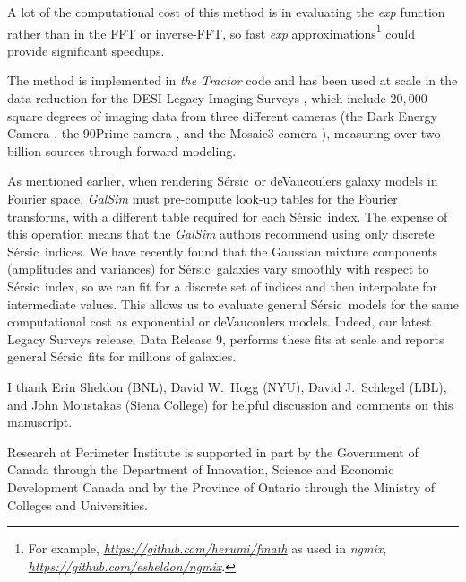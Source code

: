\documentclass[11pt,letterpaper]{aastex63}
\newcommand{\niceurl}[1]{\href{#1}{\textsl{#1}}}
\newcommand{\project}[1]{\textsl{#1}}
\newcommand{\sersic}{S\'ersic}
\begin{document}
A lot of the computational cost of this method is in
evaluating the \emph{exp} function rather than in the FFT or
inverse-FFT, so fast \emph{exp} approximations\footnote{For example,
  \niceurl{https://github.com/herumi/fmath} as used in
  \project{ngmix}, \niceurl{https://github.com/esheldon/ngmix}.}
could provide significant speedups.
%




The method is implemented in \project{the Tractor} code and has been
used at scale in the data reduction for the DESI Legacy Imaging Surveys
\citep{dey}, which include $20,000$ square degrees of imaging data from
three different cameras (the Dark Energy Camera \citep{decam},
the 90Prime camera \citep{90prime}, and the Mosaic3 camera \citep{mosaic3}),
measuring over two billion sources through forward modeling.


As mentioned earlier, when rendering \sersic\ or deVaucoulers galaxy
models in Fourier space, \project{GalSim} must pre-compute look-up
tables for the Fourier transforms, with a different table required for
each \sersic\ index.  The expense of this operation means that the
\project{GalSim} authors recommend using only discrete
\sersic\ indices.  We have recently found that the Gaussian mixture
components (amplitudes and variances) for \sersic\ galaxies vary
smoothly with respect to \sersic\ index, so we can fit for a discrete
set of indices and then interpolate for intermediate values.
This allows us to evaluate general \sersic\ models for the same
computational cost as exponential or deVaucoulers models.
Indeed, our latest Legacy Surveys release, Data Release 9, performs
these fits at scale and reports general \sersic\ fits for millions of
galaxies.




\acknowledgements

I thank Erin Sheldon (BNL),
David W.~Hogg (NYU), David J.~Schlegel (LBL), and John Moustakas (Siena College)
for helpful discussion and comments on this manuscript.

Research at Perimeter Institute is supported in part by the Government
of Canada through the Department of Innovation, Science and Economic
Development Canada and by the Province of Ontario through the Ministry
of Colleges and Universities.
\end{document}
